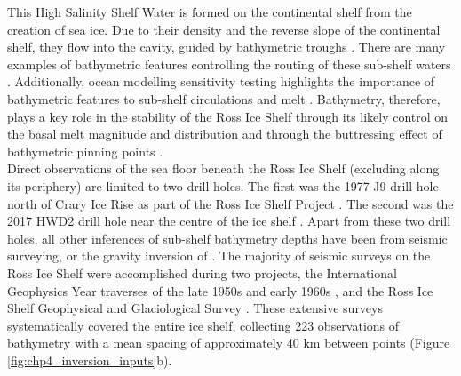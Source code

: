 This High Salinity Shelf Water is formed on the continental shelf from the creation of sea ice. Due to their density and the reverse slope of the continental shelf, they flow into the cavity, guided by bathymetric troughs \citep{jacobsmelting1992, tintoross2019}. There are many examples of bathymetric features controlling the routing of these sub-shelf waters \citep[e.g.,][]{dutrieuxstrong2014, derydtgeometric2014, zhaosillinfluenced2019, gladishoceanic2015}. Additionally, ocean modelling sensitivity testing highlights the importance of bathymetric features to sub-shelf circulations and melt \citep{goldbergbathymetric2020, derydtgeometric2014}. Bathymetry, therefore, plays a key role in the stability of the Ross Ice Shelf through its likely control on the basal melt magnitude and distribution \citep{goldberghow2019} and through the buttressing effect of bathymetric pinning points \citep{stillmechanical2019}. \\

Direct observations of the sea floor beneath the Ross Ice Shelf (excluding along its periphery) are limited to two drill holes. The first was the 1977 J9 drill hole north of Crary Ice Rise as part of the Ross Ice Shelf Project \citep{cloughross1979}. The second was the 2017 HWD2 drill hole near the centre of the ice shelf \citep{stevensocean2020}. Apart from these two drill holes, all other inferences of sub-shelf bathymetry depths have been from seismic surveying, or the gravity inversion of \citet{tintoross2019}. The majority of seismic surveys on the Ross Ice Shelf were accomplished during two projects, the International Geophysics Year traverses of the late 1950s and early 1960s \citep{craryglaciological1962,  craryoversnow1959,craryoversnow1962}, and the Ross Ice Shelf Geophysical and Glaciological Survey \citep[RIGGS, 1973-1974][]{bentleyross1984}. These extensive surveys systematically covered the entire ice shelf, collecting 223 observations of bathymetry with a mean spacing of approximately 40 km between points (Figure \ref{fig:chp4_inversion_inputs}b). \\

